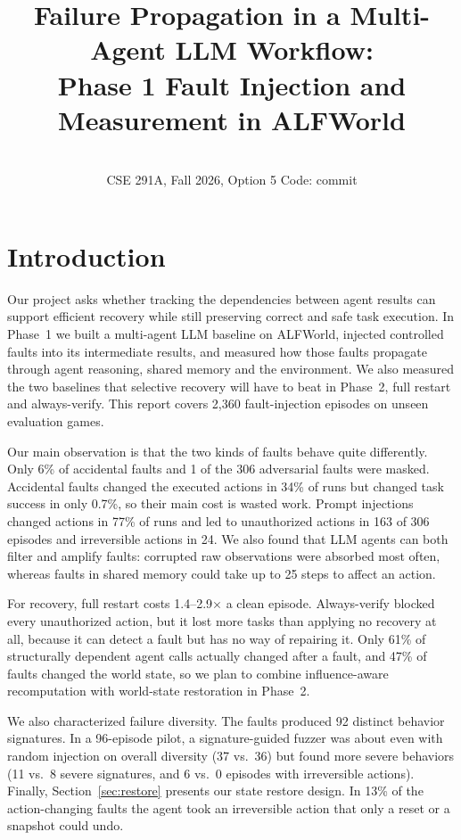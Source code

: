 \documentclass[10pt]{article}
\title{\vspace{-1.5em}Failure Propagation in a Multi-Agent LLM Workflow:\\
Phase 1 Fault Injection and Measurement in ALFWorld}
\author{\authors\\\small CSE 291A, Fall 2026, Option 5 \quad Code: commit \code{43050fa}}
\date{}
\begin{document}
\maketitle
\vspace{-2.5em}

\section{Introduction}
Our project asks whether tracking the dependencies between agent results can support
efficient recovery while still preserving correct and safe task execution. In Phase~1 we
built a multi-agent LLM baseline on ALFWorld, injected controlled faults into its
intermediate results, and measured how those faults propagate through agent reasoning,
shared memory and the environment. We also measured the two baselines that selective
recovery will have to beat in Phase~2, full restart and always-verify. This report covers
2,360 fault-injection episodes on unseen evaluation games.

Our main observation is that the two kinds of faults behave quite differently. Only 6\% of
accidental faults and 1 of the 306 adversarial faults were masked. Accidental faults changed
the executed actions in 34\% of runs but changed task success in only 0.7\%, so their main
cost is wasted work. Prompt injections changed actions in 77\% of runs and led to
unauthorized actions in 163 of 306 episodes and irreversible actions in 24. We also found that
LLM agents can both filter and amplify faults: corrupted raw observations were absorbed most
often, whereas faults in shared memory could take up to 25 steps to affect an action.

For recovery, full restart costs 1.4--2.9$\times$ a clean episode. Always-verify blocked
every unauthorized action, but it lost more tasks than applying no recovery at all, because
it can detect a fault but has no way of repairing it. Only 61\% of structurally dependent
agent calls actually changed after a fault, and 47\% of faults changed the world state, so we
plan to combine influence-aware recomputation with world-state restoration in Phase~2.

We also characterized failure diversity. The faults produced 92 distinct behavior signatures.
In a 96-episode pilot, a signature-guided fuzzer was about even with random injection on
overall diversity (37 vs.\ 36) but found more severe behaviors (11 vs.\ 8 severe signatures,
and 6 vs.\ 0 episodes with irreversible actions). Finally, Section~\ref{sec:restore} presents
our state restore design. In 13\% of the action-changing faults the agent took an irreversible
action that only a reset or a snapshot could undo.
\end{document}

